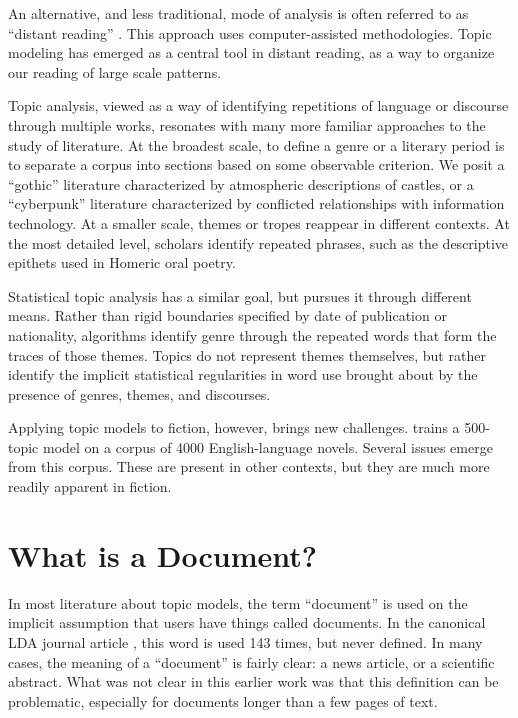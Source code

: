 An alternative, and less traditional, mode of analysis is often referred to as ``distant reading'' \citep{moretti-13}.   This approach uses computer-assisted methodologies. Topic modeling has emerged as a central tool in distant reading, as a way to organize our reading of large scale patterns.

Topic analysis, viewed as a way of identifying repetitions of language or discourse through multiple works, resonates with many more familiar approaches to the study of literature.
At the broadest scale, to define a genre or a literary period is to separate a corpus into sections based on some observable criterion.
We posit a ``gothic'' literature characterized by atmospheric descriptions of castles, or a ``cyberpunk'' literature characterized by conflicted relationships with information technology.
At a smaller scale, themes or tropes reappear in different contexts.
At the most detailed level, scholars identify repeated phrases, such as the descriptive epithets used in Homeric oral poetry.

Statistical topic analysis has a similar goal, but pursues it through different means.
Rather than rigid boundaries specified by date of publication or nationality, algorithms identify genre through the repeated words that form the traces of those themes.
Topics do not represent themes themselves, but rather identify the implicit statistical regularities in word use brought about by the presence of genres, themes, and discourses.


Applying topic models to fiction, however, brings new challenges.  \citet{jockers-13} trains a 500-topic model on a corpus of 4000 English-language novels.
Several issues emerge from this corpus. These are present in other contexts, but they are much more readily apparent in fiction.

\section{What is a Document?}

In most literature about topic models, the term ``document'' is used on the implicit assumption that users have things called documents.
In the canonical LDA journal article \citep{blei-03}, this word is used 143 times, but never defined.
In many cases, the meaning of a ``document'' is fairly clear: a news article, or a scientific abstract.
What was not clear in this earlier work was that this definition can be problematic, especially for documents longer than a few pages of text.

